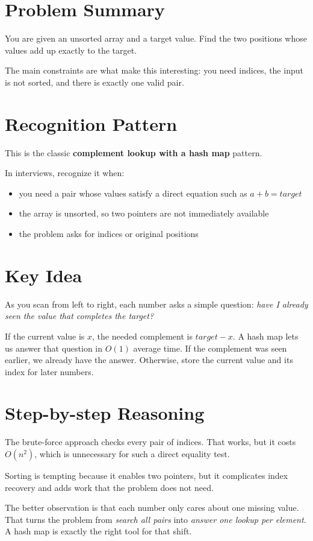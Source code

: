 \section{Problem Summary}
You are given an unsorted array and a target value. Find the two positions whose values add up exactly to the target.

The main constraints are what make this interesting: you need indices, the input is not sorted, and there is exactly one valid pair.

\section{Recognition Pattern}
This is the classic \textbf{complement lookup with a hash map} pattern.

In interviews, recognize it when:
\begin{itemize}
\item you need a pair whose values satisfy a direct equation such as \(a + b = target\)
\item the array is unsorted, so two pointers are not immediately available
\item the problem asks for indices or original positions
\end{itemize}

\section{Key Idea}
As you scan from left to right, each number asks a simple question: \emph{have I already seen the value that completes the target?}

If the current value is \(x\), the needed complement is \(target - x\). A hash map lets us answer that question in \(O(1)\) average time. If the complement was seen earlier, we already have the answer. Otherwise, store the current value and its index for later numbers.

\section{Step-by-step Reasoning}
The brute-force approach checks every pair of indices. That works, but it costs \(O(n^2)\), which is unnecessary for such a direct equality test.

Sorting is tempting because it enables two pointers, but it complicates index recovery and adds work that the problem does not need.

The better observation is that each number only cares about one missing value. That turns the problem from \emph{search all pairs} into \emph{answer one lookup per element}. A hash map is exactly the right tool for that shift.

